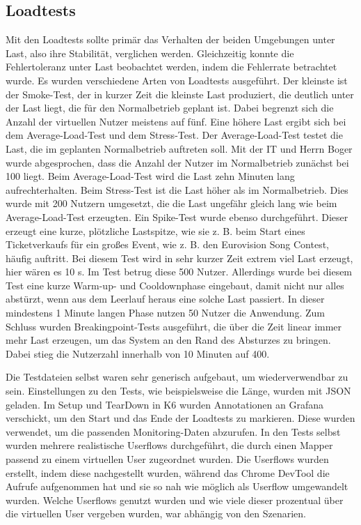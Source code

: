 \subsection{Loadtests}
Mit den Loadtests sollte primär das Verhalten der beiden Umgebungen unter Last, also ihre Stabilität, verglichen werden.
Gleichzeitig konnte die Fehlertoleranz unter Last beobachtet werden, indem die Fehlerrate betrachtet wurde.
Es wurden verschiedene Arten von Loadtests ausgeführt. Der kleinste ist der Smoke-Test, der in kurzer Zeit die kleinste Last produziert, die deutlich unter der Last liegt, die für den Normalbetrieb geplant ist.
Dabei begrenzt sich die Anzahl der virtuellen Nutzer meistens auf fünf.
Eine höhere Last ergibt sich bei dem Average-Load-Test und dem Stress-Test. Der Average-Load-Test testet die Last, die im geplanten Normalbetrieb auftreten soll.
Mit der IT und Herrn Boger wurde abgesprochen, dass die Anzahl der Nutzer im Normalbetrieb zunächst bei 100 liegt. Beim Average-Load-Test wird die Last zehn Minuten lang aufrechterhalten.
Beim Stress-Test ist die Last höher als im Normalbetrieb. Dies wurde mit 200 Nutzern umgesetzt, die die Last ungefähr gleich lang wie beim Average-Load-Test erzeugten.
Ein Spike-Test wurde ebenso durchgeführt. Dieser erzeugt eine kurze, plötzliche Lastspitze, wie sie z. B. beim Start eines Ticketverkaufs für ein großes Event, wie z. B. den Eurovision Song Contest, häufig auftritt.
Bei diesem Test wird in sehr kurzer Zeit extrem viel Last erzeugt, hier wären es 10 s. Im Test betrug diese 500 Nutzer. Allerdings wurde bei diesem Test eine kurze Warm-up- und Cooldownphase eingebaut, damit nicht nur alles abstürzt, wenn aus dem Leerlauf heraus eine solche Last passiert.
In dieser mindestens 1 Minute langen Phase nutzen 50 Nutzer die Anwendung. 
Zum Schluss wurden Breakingpoint-Tests ausgeführt, die über die Zeit linear immer mehr Last erzeugen, um das System an den Rand des Absturzes zu bringen.
Dabei stieg die Nutzerzahl innerhalb von 10 Minuten auf 400.

Die Testdateien selbst waren sehr generisch aufgebaut, um wiederverwendbar zu sein. Einstellungen zu den Tests, wie beispielsweise die Länge, wurden mit JSON geladen.
Im Setup und TearDown in K6 wurden Annotationen an Grafana verschickt, um den Start und das Ende der Loadtests zu markieren. Diese wurden verwendet, um die passenden Monitoring-Daten abzurufen.
In den Tests selbst wurden mehrere realistische Userflows durchgeführt, die durch einen Mapper passend zu einem virtuellen User zugeordnet wurden. 
Die Userflows wurden erstellt, indem diese nachgestellt wurden, während das Chrome DevTool die Aufrufe aufgenommen hat und sie so nah wie möglich als Userflow umgewandelt wurden.
Welche Userflows genutzt wurden und wie viele dieser prozentual über die virtuellen User vergeben wurden, war abhängig von den Szenarien.


